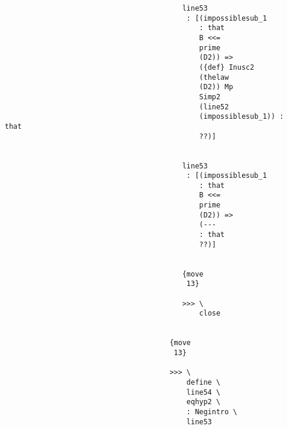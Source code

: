 \documentclass[12pt]{article}
\begin{document}
\begin{verbatim}
                                          line53 
                                           : [(impossiblesub_1 
                                              : that 
                                              B <<= 
                                              prime 
                                              (D2)) => 
                                              ({def} Inusc2 
                                              (thelaw 
                                              (D2)) Mp 
                                              Simp2 
                                              (line52 
                                              (impossiblesub_1)) : that 
                                              ??)]


                                          line53 
                                           : [(impossiblesub_1 
                                              : that 
                                              B <<= 
                                              prime 
                                              (D2)) => 
                                              (--- 
                                              : that 
                                              ??)]


                                          {move 
                                           13}

                                          >>> \
                                              close


                                       {move 
                                        13}

                                       >>> \
                                           define \
                                           line54 \
                                           eqhyp2 \
                                           : Negintro \
                                           line53



\end{verbatim}
\end{document}
